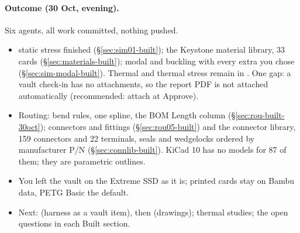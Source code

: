 \paragraph{Outcome (30 Oct, evening).} Six agents, all work committed, nothing pushed.
\begin{itemize}[nosep]
  \item {} static stress finished (\S\ref{sec:sim01-built}); the Keystone material library, 33 cards
        (\S\ref{sec:materials-built}); modal and buckling with every extra you chose (\S\ref{sec:sim-modal-built}).
        Thermal and thermal stress remain in . One gap: a vault check-in has no attachments, so the
        report PDF is not attached automatically (recommended: attach at Approve).
  \item Routing: bend rules, one spline, the BOM Length column (\S\ref{sec:rou-built-30oct}); 
        connectors and fittings (\S\ref{sec:rou05-built}) and the connector library, 159 connectors and 22
        terminals, seals and wedgelocks ordered by manufacturer P/N (\S\ref{sec:connlib-built}). KiCad 10 has
        no models for 87 of them; they are parametric outlines.
  \item You left the vault on the Extreme SSD as it is; printed cards stay on Bambu data, PETG Basic the default.
  \item Next:  (harness as a vault item), then  (drawings); thermal studies; the open
        questions in each Built section.
\end{itemize}

